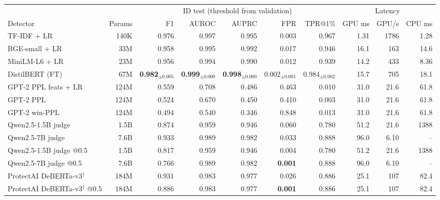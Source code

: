 \begin{tabular}{lrrrrrrrrr}
\toprule
 & & \multicolumn{5}{c}{ID test (threshold from validation)} & \multicolumn{3}{c}{Latency} \\
\cmidrule(lr){3-7}\cmidrule(lr){8-10}
Detector & Params & F1 & AUROC & AUPRC & FPR & TPR@1\% & GPU ms & GPU/s & CPU ms \\
\midrule
TF-IDF + LR & 140K & 0.976 & 0.997 & 0.995 & 0.003 & 0.967 & 1.31 & 1786 & 1.28 \\
\midrule
BGE-small + LR & 33M & 0.958 & 0.995 & 0.992 & 0.017 & 0.946 & 16.1 & 163 & 14.6 \\
MiniLM-L6 + LR & 23M & 0.956 & 0.994 & 0.990 & 0.012 & 0.939 & 14.2 & 433 & 8.36 \\
\midrule
DistilBERT (FT) & 67M & \textbf{0.982$_{\pm 0.005}$} & \textbf{0.999$_{\pm 0.000}$} & \textbf{0.998$_{\pm 0.000}$} & 0.002$_{\pm 0.001}$ & 0.984$_{\pm 0.002}$ & 15.7 & 705 & 18.1 \\
\midrule
GPT-2 PPL feats + LR & 124M & 0.559 & 0.708 & 0.486 & 0.463 & 0.010 & 31.0 & 21.6 & 61.8 \\
GPT-2 PPL & 124M & 0.524 & 0.670 & 0.450 & 0.410 & 0.003 & 31.0 & 21.6 & 61.8 \\
GPT-2 win-PPL & 124M & 0.494 & 0.540 & 0.346 & 0.848 & 0.013 & 31.0 & 21.6 & 61.8 \\
\midrule
Qwen2.5-1.5B judge & 1.5B & 0.874 & 0.959 & 0.946 & 0.060 & 0.780 & 51.2 & 21.6 & 1388 \\
Qwen2.5-7B judge & 7.6B & 0.933 & 0.989 & 0.982 & 0.033 & 0.888 & 96.0 & 6.10 & -- \\
Qwen2.5-1.5B judge @0.5 & 1.5B & 0.817 & 0.959 & 0.946 & 0.004 & 0.780 & 51.2 & 21.6 & 1388 \\
Qwen2.5-7B judge @0.5 & 7.6B & 0.766 & 0.989 & 0.982 & \textbf{0.001} & 0.888 & 96.0 & 6.10 & -- \\
\midrule
ProtectAI DeBERTa-v3$^\dagger$ & 184M & 0.931 & 0.983 & 0.977 & 0.026 & 0.886 & 25.1 & 107 & 82.4 \\
ProtectAI DeBERTa-v3$^\dagger$ @0.5 & 184M & 0.886 & 0.983 & 0.977 & \textbf{0.001} & 0.886 & 25.1 & 107 & 82.4 \\
\bottomrule
\end{tabular}